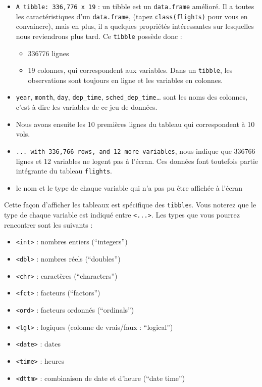 \documentclass[a4paperpaper,]{article}
\providecommand{\tightlist}{%
  \setlength{\itemsep}{0pt}\setlength{\parskip}{0pt}}
\begin{document}
\begin{itemize}
\tightlist
\item
  \texttt{A\ tibble:\ 336,776\ x\ 19} : un tibble est un \texttt{data.frame} amélioré. Il a toutes les caractéristiques d'un \texttt{data.frame}, (tapez \texttt{class(flights)} pour vous en convaincre), mais en plus, il a quelques propriétés intéressantes sur lesquelles nous reviendrons plus tard. Ce \texttt{tibble} possède donc :

  \begin{itemize}
  \tightlist
  \item
    336776 lignes
  \item
    19 colonnes, qui correspondent aux variables. Dans un \texttt{tibble}, les observations sont toujours en ligne et les variables en colonnes.
  \end{itemize}
\item
  \texttt{year}, \texttt{month}, \texttt{day}, \texttt{dep\_time}, \texttt{sched\_dep\_time}\ldots{} sont les noms des colonnes, c'est à dire les variables de ce jeu de données.
\item
  Nous avons ensuite les 10 premières lignes du tableau qui correspondent à 10 vols.
\item
  \texttt{...\ with\ 336,766\ rows,\ and\ 12\ more\ variables}, nous indique que 336766 lignes et 12 variables ne logent pas à l'écran. Ces données font toutefois partie intégrante du tableau \texttt{flights}.
\item
  le nom et le type de chaque variable qui n'a pas pu être affichée à l'écran
\end{itemize}

Cette façon d'afficher les tableaux est spécifique des \texttt{tibble}s. Vous noterez que le type de chaque variable est indiqué entre \texttt{\textless{}...\textgreater{}}. Les types que vous pourrez rencontrer sont les suivants :

\begin{itemize}
\tightlist
\item
  \texttt{\textless{}int\textgreater{}} : nombres entiers (``integers'')
\item
  \texttt{\textless{}dbl\textgreater{}} : nombres réels (``doubles'')
\item
  \texttt{\textless{}chr\textgreater{}} : caractères (``characters'')
\item
  \texttt{\textless{}fct\textgreater{}} : facteurs (``factors'')
\item
  \texttt{\textless{}ord\textgreater{}} : facteurs ordonnés (``ordinals'')
\item
  \texttt{\textless{}lgl\textgreater{}} : logiques (colonne de vrais/faux : ``logical'')
\item
  \texttt{\textless{}date\textgreater{}} : dates
\item
  \texttt{\textless{}time\textgreater{}} : heures
\item
  \texttt{\textless{}dttm\textgreater{}} : combinaison de date et d'heure (``date time'')
\end{itemize}
\end{document}
